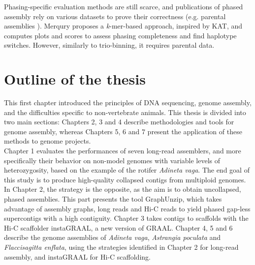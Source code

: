 Phasing-specific evaluation methods are still scarce, and publications of phased assembly rely on various datasets to prove their correctness (e.g. parental assemblies \cite{phased_human}). Merqury \cite{merqury} proposes a \textit{k}-mer-based approach, inspired by KAT, and computes plots and scores to assess phasing completeness and find haplotype switches. However, similarly to trio-binning, it requires parental data. \\

\section{Outline of the thesis}

This first chapter introduced the principles of DNA sequencing, genome assembly, and the difficulties specific to non-vertebrate animals. This thesis is divided into two main sections: Chapters 2, 3 and 4 describe methodologies and tools for genome assembly, whereas Chapters 5, 6 and 7 present the application of these methods to genome projects. \\
Chapter 1 evaluates the performances of seven long-read assemblers, and more specifically their behavior on non-model genomes with variable levels of heterozygosity, based on the example of the rotifer \textit{Adineta vaga}. The end goal of this study is to produce high-quality collapsed contigs from multiploid genomes. In Chapter 2, the strategy is the opposite, as the aim is to obtain uncollapsed, phased assemblies. This part presents the tool GraphUnzip, which takes advantage of assembly graphs, long reads and Hi-C reads to yield phased gap-less supercontigs with a high contiguity. Chapter 3 takes contigs to scaffolds with the Hi-C scaffolder instaGRAAL, a new version of GRAAL. Chapter 4, 5 and 6 describe the genome assemblies of \textit{Adineta vaga}, \textit{Astrangia poculata} and \textit{Flaccisagitta enflata}, using the strategies identified in Chapter 2 for long-read assembly, and instaGRAAL for Hi-C scaffolding.  \\
